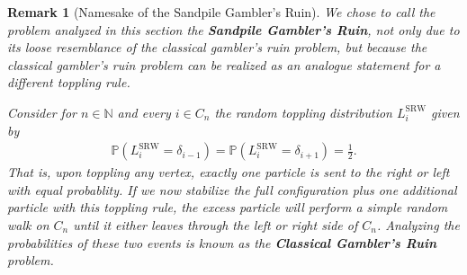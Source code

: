 \documentclass[11pt]{article}
\newtheorem{remark}{Remark}[section]
\newcommand{\N}{\mathbb{N}}
\newcommand{\prob}{\mathbb{P}}
\begin{document}
\begin{remark}[Namesake of the Sandpile Gambler's Ruin]
    We chose to call the problem analyzed in this section the {\bf Sandpile Gambler's Ruin}, not only due to its loose resemblance of the classical gambler's ruin problem, but because the classical gambler's ruin problem can be realized as an analogue statement for a different toppling rule.

    Consider for $n\in\N$ and every $i\in C_n$ the random toppling distribution $L^{\text{SRW}}_i$ given by
    \begin{align*}
        \prob(L^{\text{SRW}}_i=\delta_{i-1})=\prob(L^{\text{SRW}}_i=\delta_{i+1})=\frac{1}{2}.
    \end{align*}
    That is, upon toppling any vertex, exactly one particle is sent to the right or left with equal probablity. If we now stabilize the full configuration plus one additional particle with this toppling rule, the excess particle will perform a simple random walk on $C_n$ until it either leaves through the left or right side of $C_n$. Analyzing the probabilities of these two events is known as the \textbf{Classical Gambler's Ruin} problem.
\end{remark}
\end{document}
